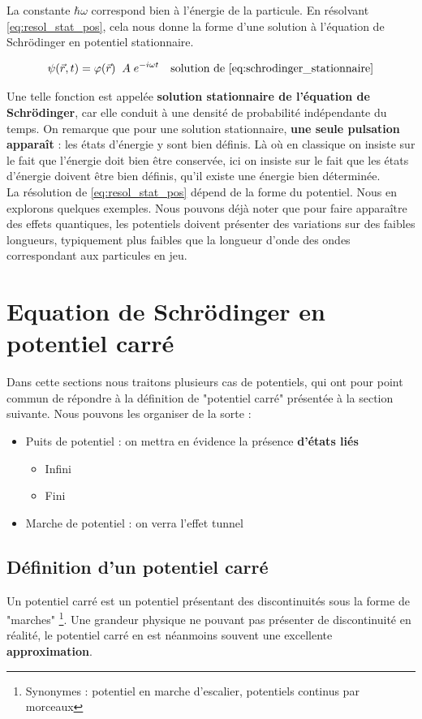 \documentclass[12pt, a4paper]{book}
\begin{document}
La constante $\hbar \omega$ correspond bien à l'énergie de la particule. En résolvant \eqref{eq:resol_stat_pos}, cela nous donne la forme d'une solution à l'équation de Schrödinger en potentiel stationnaire.

\begin{equation}
\psi(\vec r, t) = \varphi(\vec r) \; \;  A \;e^{-i\omega t} \quad \text{solution de \eqref{eq:schrodinger_stationnaire}}
\end{equation}


Une telle fonction est appelée \textbf{solution stationnaire de l'équation de Schrödinger}, car elle conduit à une densité de probabilité indépendante du temps. On remarque que pour une solution stationnaire, \textbf{une seule pulsation apparaît} : les états d'énergie y sont bien définis. Là où en classique on insiste sur le fait que l'énergie doit bien être conservée, ici on insiste sur le fait que les états d'énergie doivent être bien définis, qu'il existe une énergie bien déterminée. \\

La résolution de \eqref{eq:resol_stat_pos} dépend de la forme du potentiel. Nous en explorons quelques exemples. Nous pouvons déjà noter que pour faire apparaître des effets quantiques, les potentiels doivent présenter des variations sur des faibles longueurs, typiquement plus faibles que la longueur d'onde des ondes correspondant aux particules en jeu.


\section{Equation de Schrödinger en potentiel carré}
Dans cette sections nous traitons plusieurs cas de potentiels, qui ont pour point commun de répondre à la définition de "potentiel carré" présentée à la section suivante. Nous pouvons les organiser de la sorte :
\begin{itemize}
  \item Puits de potentiel : on mettra en évidence la présence \textbf{d'états liés}
    \begin{itemize}[label = $\star$]
      \item Infini
      \item Fini
    \end{itemize}
  \item Marche de potentiel : on verra l'effet tunnel
\end{itemize}
\subsection{Définition d'un potentiel carré} \label{ch2-subsection-Definition_pot_carre}
Un potentiel carré est un potentiel présentant des discontinuités sous la forme de "marches" \footnote{Synonymes : potentiel en marche d'escalier, potentiels continus par morceaux}. Une grandeur physique ne pouvant pas présenter de discontinuité en réalité, le potentiel carré en est néanmoins souvent une excellente \textbf{approximation}.
\end{document}
